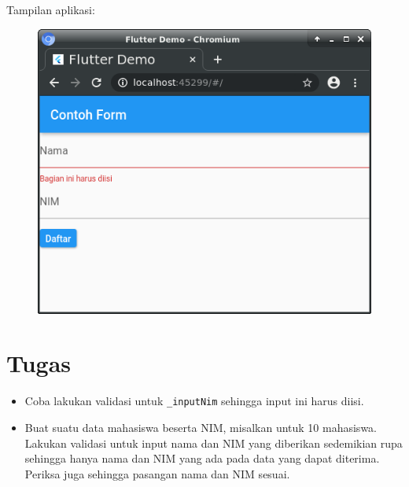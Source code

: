 \documentclass[a4paper,11pt]{article} %
\newcommand{\txtinline}[1]{\texttt{#1}}
\begin{document}
Tampilan aplikasi:
\begin{figure}[h]
{\centering
\includegraphics[scale=0.5]{images/simpleform02.png}
\par}
\end{figure}


\section{Tugas}
\begin{itemize}
\item Coba lakukan validasi untuk \txtinline{_inputNim} sehingga input ini harus diisi.
\item Buat suatu data mahasiswa beserta NIM, misalkan untuk 10 mahasiswa. Lakukan
validasi untuk input nama dan NIM yang diberikan sedemikian rupa sehingga hanya nama dan
NIM yang ada pada data yang dapat diterima. Periksa juga sehingga pasangan nama
dan NIM sesuai.
\end{itemize}




\end{document}
